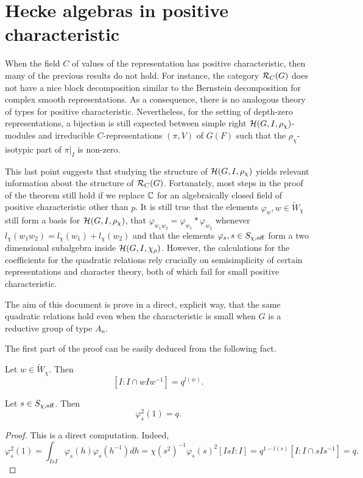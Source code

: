\section{Hecke algebras in positive characteristic}
    
    When the field $C$ of values of the representation has positive characteristic, then many of the previous results do not hold. For instance, the category $\mathcal{R}_C(G)$ does not have a nice block decomposition similar to the Bernstein decomposition for complex smooth representations. As a consequence, there is no analogous theory of types for positive characteristic. Nevertheless, for the setting of depth-zero representations, a bijection is still expected between simple right $\mathcal{H}(G,I,\rho_\chi)$-modules and irreducible $C$-representations $(\pi,V)$ of $G(F)$ such that the $\rho_\chi$-isotypic part of $\pi|_I$ is non-zero. 

    This last point suggests that studying the structure of $\mathcal{H}(G,I,\rho_\chi)$ yields relevant information about the structure of $\mathcal{R}_C(G)$. Fortunately, most steps in the proof of the theorem still hold if we replace $\mathbb{C}$ for an algebraically closed field of positive characteristic other than $p$. It is still true that the elements $\varphi_w, w\in\tilde{W}_\chi$ still form a basis for $\mathcal{H}(G,I,\rho_\chi)$, that $\varphi_{w_1w_2}=\varphi_{w_1}*\varphi_{w_2}$ whenever $l_\chi(w_1w_2)=l_\chi(w_1)+l_\chi(w_2)$ and that the elements $\varphi_s, s\in S_{\chi,\mathrm{aff}}$ form a two dimensional subalgebra inside $\mathcal{H}(G,I,\chi_\rho)$. However, the calculations for the coefficients for the quadratic relations rely crucially on semisimplicity of certain representations and character theory, both of which fail for small positive characteristic. 

    The aim of this document is prove in a direct, explicit way, that the same quadratic relations hold even when the characteristic is small when $G$ is a reductive group of type $A_n$.

    The first part of the proof can be easily deduced from the following fact.

    \begin{lemma}
        Let $w\in\tilde{W}_\chi$. Then
        $$[I:I\cap wIw^{-1}]=q^{l(w)}.$$
    \end{lemma}

    \begin{lemma}
        Let $s\in S_{\chi,\mathrm{aff}}$. Then
        $$\varphi_s^2(1)=q.$$
    \end{lemma}
    \begin{proof}
        This is a direct computation. Indeed,
        \begin{equation*}
            \varphi_s^2(1)=\int_{IsI}\varphi_s(h)\varphi_s(h^{-1})dh=\chi(s^2)^{-1}\varphi_s(s)^2[IsI:I]=q^{1-l(s)}[I:I\cap sIs^{-1}]=q.
        \end{equation*}
    \end{proof}

